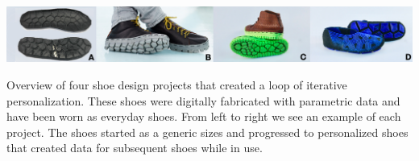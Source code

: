 \documentclass[sigconf]{acmart}
\begin{document}

\begin{teaserfigure}
\centering
\includegraphics[width=6.0in]{Header}
\caption{Overview of four shoe design projects that created a loop of iterative personalization. These shoes were digitally fabricated with parametric data and have been worn as everyday shoes. From left to right we see an example of each project. The shoes started as a generic sizes and progressed to personalized shoes that created data for subsequent shoes while in use.}
\end{teaserfigure}

\maketitle





\end{document}

